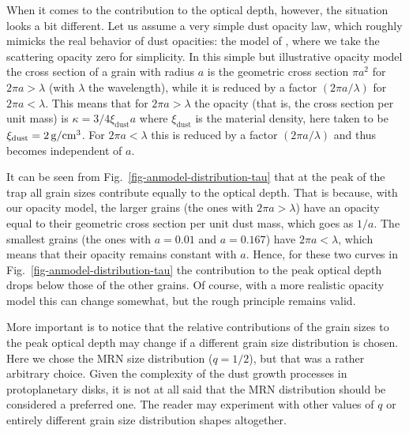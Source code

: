 \documentclass{aa}
\def\cm{\hbox{cm}}
\begin{document}
When it comes to the contribution to the optical depth, however, the situation
looks a bit different. Let us assume a very simple dust opacity law, which
roughly mimicks the real behavior of dust opacities: the model of
\citet{1997MNRAS.291..121I}, where we take the scattering opacity zero for
simplicity. In this simple but illustrative opacity model the cross
section of a grain with radius $a$ is the geometric cross section $\pi a^2$
for $2\pi a>\lambda$ (with $\lambda$ the wavelength), while it is reduced by
a factor $(2\pi a/\lambda)$ for $2\pi a<\lambda$. This means that for
$2\pi a>\lambda$ the opacity (that is, the cross section per unit mass)
is $\kappa=3/4\xi_{\mathrm{dust}} a$ where $\xi_{\mathrm{dust}}$ is the material
density, here taken to be $\xi_{\mathrm{dust}}=2\,\mathrm{g}/\cm^3$. For
$2\pi a<\lambda$ this is reduced by a factor $(2\pi a/\lambda)$ and
thus becomes independent of $a$.

It can be seen from Fig.~\ref{fig-anmodel-distribution-tau} that at the peak of
the trap all grain sizes contribute equally to the optical depth. That is
because, with our opacity model, the larger grains (the ones with $2\pi a >
\lambda$) have an opacity equal to their geometric cross section per unit dust
mass, which goes as $1/a$. The smallest grains (the ones with $a=0.01$ and
$a=0.167$) have $2\pi a < \lambda$, which means that their opacity remains
constant with $a$. Hence, for these two curves in
Fig.~\ref{fig-anmodel-distribution-tau} the contribution to the peak optical
depth drops below those of the other grains. Of course, with a more realistic
opacity model this can change somewhat, but the rough principle remains valid.

More important is to notice that the relative contributions of the grain sizes
to the peak optical depth may change if a different grain size distribution is
chosen. Here we chose the MRN size distribution ($q=1/2$), but that was a rather
arbitrary choice. Given the complexity of the dust growth processes in
protoplanetary disks, it is not at all said that the MRN distribution should be
considered a preferred one. The reader may experiment with other values of
$q$ or entirely different grain size distribution shapes altogether.
\end{document}
